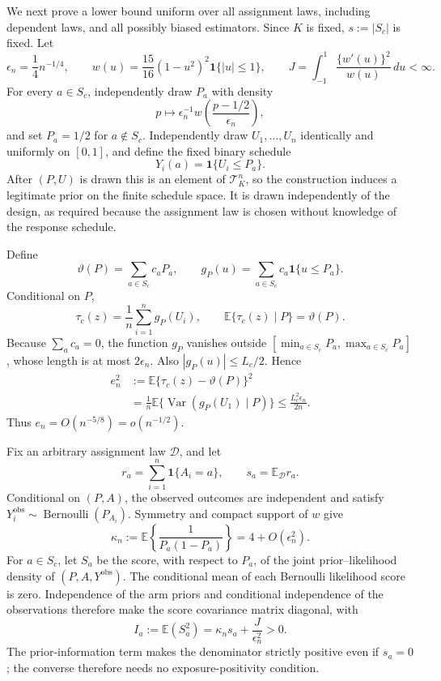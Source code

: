We next prove a lower bound uniform over all assignment laws, including dependent laws, and all possibly biased estimators.  Since \(K\) is fixed, \(s:=|S_c|\) is fixed.  Let
\[
 \epsilon_n=\frac14n^{-1/4},
 \qquad
 w(u)=\frac{15}{16}(1-u^2)^2\mathbf 1\{|u|\leq1\},
 \qquad
 J=\int_{-1}^1\frac{\{w'(u)\}^2}{w(u)}\,du<\infty.
\]
For every \(a\in S_c\), independently draw \(P_a\) with density
\[
 p\longmapsto\epsilon_n^{-1}w\!\left(\frac{p-1/2}{\epsilon_n}\right),
\]
and set \(P_a=1/2\) for \(a\notin S_c\).  Independently draw \(U_1,\ldots,U_n\) identically and uniformly on \([0,1]\), and define the fixed binary schedule
\[
 Y_i(a)=\mathbf 1\{U_i\leq P_a\}.
\]
After \((P,U)\) is drawn this is an element of \(\mathcal T_K^n\), so the construction induces a legitimate prior on the finite schedule space.  It is drawn independently of the design, as required because the assignment law is chosen without knowledge of the response schedule.

Define
\[
 \vartheta(P)=\sum_{a\in S_c}c_aP_a,
 \qquad
 g_P(u)=\sum_{a\in S_c}c_a\mathbf 1\{u\leq P_a\}.
\]
Conditional on \(P\),
\[
 \tau_c(z)=\frac1n\sum_{i=1}^ng_P(U_i),
 \qquad
 \mathbb E\{\tau_c(z)\mid P\}=\vartheta(P).
\]
Because \(\sum_a c_a=0\), the function \(g_P\) vanishes outside
\([\min_{a\in S_c}P_a,\max_{a\in S_c}P_a]\), whose length is at most \(2\epsilon_n\).  Also \(|g_P(u)|\leq L_c/2\).  Hence
\[
 \begin{aligned}
 e_n^2
 &:=\mathbb E\{\tau_c(z)-\vartheta(P)\}^2\\
 &=\frac1n\mathbb E\{\operatorname{Var}(g_P(U_1)\mid P)\}
 \leq\frac{L_c^2\epsilon_n}{2n}.
 \end{aligned}
\]
Thus \(e_n=O(n^{-5/8})=o(n^{-1/2})\).

Fix an arbitrary assignment law \(\mathcal D\), and let
\[
 r_a=\sum_{i=1}^n\mathbf 1\{A_i=a\},
 \qquad s_a=\mathbb E_{\mathcal D}r_a.
\]
Conditional on \((P,A)\), the observed outcomes are independent and satisfy
\(Y_i^{\mathrm{obs}}\sim\operatorname{Bernoulli}(P_{A_i})\).  Symmetry and compact support of \(w\) give
\[
 \kappa_n:=\mathbb E\!\left\{\frac1{P_a(1-P_a)}\right\}
 =4+O(\epsilon_n^2).
\]
For \(a\in S_c\), let \(S_a\) be the score, with respect to \(P_a\), of the joint prior--likelihood density of \((P,A,Y^{\mathrm{obs}})\).  The conditional mean of each Bernoulli likelihood score is zero.  Independence of the arm priors and conditional independence of the observations therefore make the score covariance matrix diagonal, with
\[
 I_a:=\mathbb E(S_a^2)
 =\kappa_ns_a+\frac{J}{\epsilon_n^2}>0.
\]
The prior-information term makes the denominator strictly positive even if \(s_a=0\); the converse therefore needs no exposure-positivity condition.


